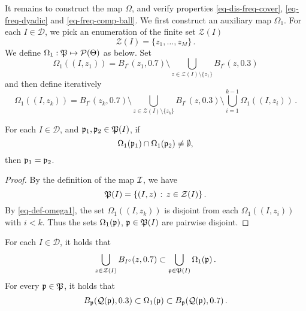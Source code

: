 It remains to construct the map $\Omega$, and verify properties \eqref{eq-dis-freq-cover}, \eqref{eq-freq-dyadic} and
\eqref{eq-freq-comp-ball}. We first construct an auxiliary map $\Omega_1$. For each $I \in \mathcal{D}$, we pick an enumeration of the finite set $\mathcal{Z}(I)$
$$
    \mathcal{Z}(I) = \{z_1, \dotsc, z_M\}\,.
$$
We define {$\Omega_1:{\mathfrak P} \mapsto \mathcal{P}({\Theta}) $ as below}. Set
$$
    \Omega_1((I, z_1)) = B_{I^\circ}(z_1, 0.7) \setminus \bigcup_{z \in \mathcal{Z}(I)\setminus \{z_1\}} B_{I^\circ}(z, 0.3)
$$
and then define iteratively
\begin{equation}
    \label{eq-def-omega1}
    \Omega_1((I, z_k)) = B_{I^\circ}(z_k, 0.7) \setminus \bigcup_{z \in \mathcal{Z}(I) \setminus \{z_k\}} B_{I^\circ}(z, 0.3) \setminus \bigcup_{i=1}^{k-1} \Omega_1((I, z_i))\,.
\end{equation}
\begin{lemma}
    \label{disjoint-frequency-cubes}
    \leanok
    For each $I \in \mathcal{D}$, and ${\mathfrak p}_1, {\mathfrak p}_2\in {\mathfrak P}(I)$,
    if $$\Omega_1({\mathfrak p}_1)\cap \Omega_1({\mathfrak p}_2)\neq \emptyset,$$ then ${\mathfrak p}_1={\mathfrak p}_2$.
\end{lemma}

\begin{proof}
    \leanok
    By the definition of the map ${\mathcal{I}}$, we have
    $$
        {\mathfrak P}(I) = \{(I, z) \, : \, z \in \mathcal{Z}(I)\}\,.
    $$
    By \eqref{eq-def-omega1}, the set $\Omega_1((I, z_k))$ is disjoint from each $\Omega_1((I, z_i))$ with $i < k$. Thus the sets $\Omega_1({\mathfrak p})$, ${\mathfrak p} \in {\mathfrak P}(I)$ are pairwise disjoint.
\end{proof}

\begin{lemma}
    \label{frequency-cube-cover}
    \leanok
    For each $I \in \mathcal{D}$, it holds that
    \begin{equation}
    \label{eq-omega1-cover}
            \bigcup_{z \in \mathcal{Z}(I)} B_{I^\circ}(z, 0.7)\subset \bigcup_{{\mathfrak p} \in {\mathfrak P}(I)} \Omega_1({\mathfrak p})\,.
    \end{equation}
    For every ${\mathfrak p} \in {\mathfrak P}$, it holds that
    \begin{equation}
        \label{eq-omega1-incl}
        B_{{\mathfrak p}}({\mathcal{Q}}({\mathfrak p}), 0.3) \subset \Omega_1({\mathfrak p}) \subset B_{{\mathfrak p}}({\mathcal{Q}}({\mathfrak p}), 0.7)\,.
    \end{equation}
\end{lemma}

